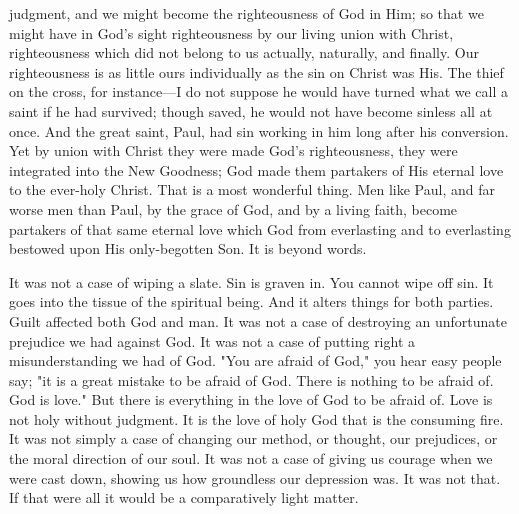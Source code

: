 \documentclass[12pt,letterpaper,oneside]{book}
\begin{document}
judgment, and we might become the righteousness 
of God in Him; so that we might have 
in God's sight righteousness by our living 
union with Christ, righteousness which did 
not belong to us actually, naturally, and 
finally. Our righteousness is as little ours individually 
as the sin on Christ was His. The 
thief on the cross, for instance---I do not suppose 
he would have turned what we call a saint 
if he had survived; though saved, he would 
not have become sinless all at once. And the 
great saint, Paul, had sin working in him long 
after his conversion. Yet by union with Christ 
they were made God's righteousness, they were 
integrated into the New Goodness; God made 
them partakers of His eternal love to the ever-holy 
Christ. That is a most wonderful thing. 
Men like Paul, and far worse men than Paul, 
by the grace of God, and by a living faith, 
become partakers of that same eternal love 
which God from everlasting and to everlasting 
bestowed upon His only-begotten Son. It is 
beyond words. 

It was not a case of wiping a slate. Sin 
is graven in. You cannot wipe off sin. It 
goes into the tissue of the spiritual being. And 
it alters things for both parties. Guilt affected 
both God and man. It was not a case of destroying 
an unfortunate prejudice we had 
against God. It was not a case of putting 
right a misunderstanding we had of God. 
"You are afraid of God," you hear easy people 
say; "it is a great mistake to be afraid of 
God. There is nothing to be afraid of. God is 
love." But there is everything in the love of 
God to be afraid of. Love is not holy without 
judgment. It is the love of holy God that 
is the consuming fire. It was not simply a 
case of changing our method, or thought, our 
prejudices, or the moral direction of our soul. 
It was not a case of giving us courage when we 
were cast down, showing us how groundless 
our depression was. It was not that. If that 
were all it would be a comparatively light 
matter. 
\end{document}
